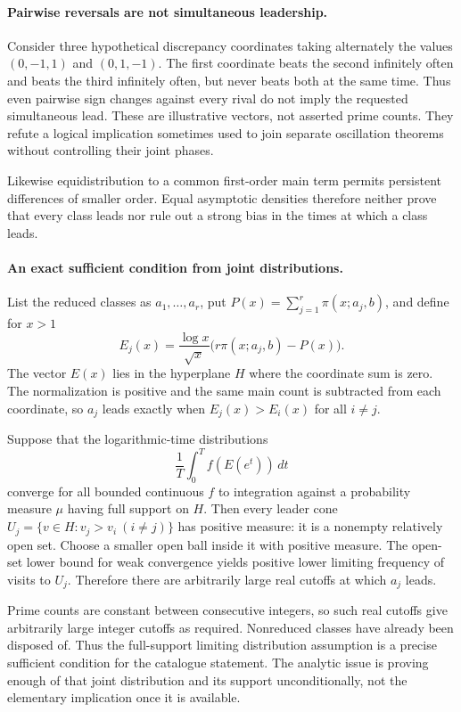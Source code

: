 \documentclass[11pt,a4paper]{article}
\begin{document}
\paragraph{Pairwise reversals are not simultaneous leadership.}
Consider three hypothetical discrepancy coordinates taking alternately
the values $(0,-1,1)$ and $(0,1,-1)$. The first coordinate beats the
second infinitely often and beats the third infinitely often, but
never beats both at the same time. Thus even pairwise sign changes
against every rival do not imply the requested simultaneous lead.
These are illustrative vectors, not asserted prime counts. They refute
a logical implication sometimes used to join separate oscillation
theorems without controlling their joint phases.

Likewise equidistribution to a common first-order main term permits
persistent differences of smaller order. Equal asymptotic densities
therefore neither prove that every class leads nor rule out a strong
bias in the times at which a class leads.

\paragraph{An exact sufficient condition from joint distributions.}
List the reduced classes as $a_1,\ldots,a_r$, put
$P(x)=\sum_{j=1}^r\pi(x;a_j,b)$, and define for $x>1$
\[
 E_j(x)=\frac{\log x}{\sqrt x}
        \bigl(r\pi(x;a_j,b)-P(x)\bigr).
\]
The vector $E(x)$ lies in the hyperplane $H$ where the coordinate sum
is zero. The normalization is positive and the same main count is
subtracted from each coordinate, so $a_j$ leads exactly when
$E_j(x)>E_i(x)$ for all $i\ne j$.

Suppose that the logarithmic-time distributions
\[
 \frac1T\int_0^T f(E(e^t))\,dt
\]
converge for all bounded continuous $f$ to integration against a
probability measure $\mu$ having full support on $H$. Then every
leader cone $U_j=\{v\in H:v_j>v_i\ (i\ne j)\}$ has positive
measure: it is a nonempty relatively open set. Choose a smaller open
ball inside it with positive measure. The open-set lower bound for
weak convergence yields positive lower limiting frequency of visits
to $U_j$. Therefore there are arbitrarily large real cutoffs at which
$a_j$ leads.

Prime counts are constant between consecutive integers, so such real
cutoffs give arbitrarily large integer cutoffs as required. Nonreduced
classes have already been disposed of. Thus the full-support limiting
distribution assumption is a precise sufficient condition for the
catalogue statement. The analytic issue is proving enough of that joint
distribution and its support unconditionally, not the elementary
implication once it is available.
\end{document}
